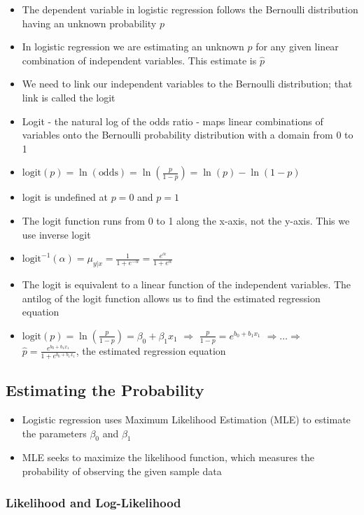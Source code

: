 \documentclass{article}
\begin{document}
\begin{itemize}
    \item The dependent variable in logistic regression follows the Bernoulli distribution having an unknown probability $p$
    \item In logistic regression we are estimating an unknown $p$ for any given linear combination of independent variables. This estimate is $\hat{p}$
    \item We need to link our independent variables to the Bernoulli distribution; that link is called the logit
    \item Logit - the natural log of the odds ratio - maps linear combinations of variables onto the Bernoulli probability distribution with a domain from 0 to 1
    \item $\text{logit}(p)=\ln(\text{odds})=\ln(\frac{p}{1-p})=\ln(p)-\ln(1-p)$
    \item $\text{logit}$ is undefined at $p=0$ and $p=1$
    \item The logit function runs from 0 to 1 along the x-axis, not the y-axis. This we use inverse logit
    \item $\text{logit}^{-1}(\alpha)=\mu_{y|x}=\frac{1}{1+e^{-\alpha}}=\frac{e^{\alpha}}{1+e^{\alpha}}$
    \item The logit is equivalent to a linear function of the independent variables. The antilog of the logit function allows us to find the estimated regression equation
    \item $\text{logit}(p)=\ln(\frac{p}{1-p})=\beta_0+\beta_1x_1$ $\Rightarrow$ $\frac{p}{1-p}=e^{b_0+b_1 x_1}$ $\Rightarrow \dots \Rightarrow$ $\hat{p}=\frac{e^{b_0+b_1 x_1}}{1 + e^{b_0+b_1 x_1}}$, the estimated regression equation
\end{itemize}

\subsection{Estimating the Probability}

\begin{itemize}
    \item Logistic regression uses Maximum Likelihood Estimation (MLE) to estimate the parameters $\beta_0$ and $\beta_1$
    \item MLE seeks to maximize the likelihood function, which measures the probability of observing the given sample data
\end{itemize}

\subsubsection{Likelihood and Log-Likelihood}
\end{document}
